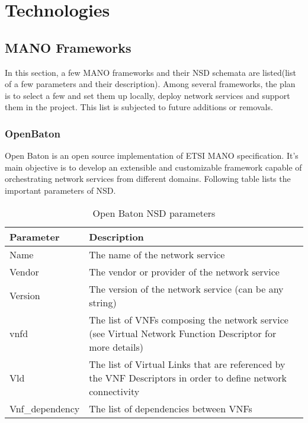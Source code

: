 \chapter{Technologies}
\label{ch:Technologies}
\section{MANO Frameworks}
\label{manoframeworks}
In this section, a few MANO frameworks and their NSD schemata are listed(list of a few parameters and their description). Among several frameworks, the plan is to select a few and set them up locally, deploy network services and support them in the project. This list is subjected to future additions or removals.
\subsection{OpenBaton}
Open Baton is an open source implementation of ETSI MANO specification. It's main objective is to develop an extensible and customizable framework capable of orchestrating network services from different domains\cite{openBaton}. Following table lists the important parameters of NSD\cite{openBatonSchemaDocumentation}. 
    \begin{table}[h]
        \centering
        \begin{tabular}{ |p{4cm}|p{10cm}|}
            \hline
            \textbf{Parameter} & \textbf{Description} \\
            \hline
             
             Name & The name of the network service \\
             \hline
             Vendor & The vendor or provider of the network service \\
             \hline
             Version & The version of the network service (can be any string) \\
             \hline
             vnfd & The list of VNFs composing the network service (see Virtual Network Function Descriptor for more details) \\
             \hline
             Vld & The list of Virtual Links that are referenced by the VNF Descriptors in order to define network connectivity \\
             \hline
             Vnf\_dependency & The list of dependencies between VNFs\\
             \hline
        \end{tabular}
        \caption{Open Baton NSD parameters}
        \label{tab:OpenBatonSchema}
    \end{table}
